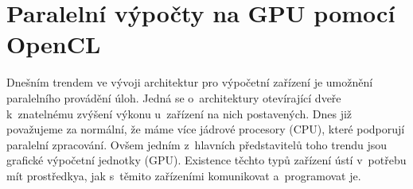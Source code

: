 %

\chapter{Paralelní výpočty na GPU pomocí OpenCL}
\label{ch:opencl}
Dnešním trendem ve vývoji architektur pro výpočetní zařízení je umožnění paralelního provádění
úloh. Jedná se o~architektury otevírající dveře k~znatelnému zvýšení výkonu u~zařízení na nich
postavených. Dnes již považujeme za normální, že máme více jádrové procesory (CPU), které
podporují paralelní zpracování. Ovšem jedním z~hlavních představitelů toho trendu jsou grafické 
výpočetní jednotky (GPU). Existence těchto typů zařízení ústí v~potřebu mít prostředkya, jak s~těmito
zařízeními komunikovat a~programovat je.

